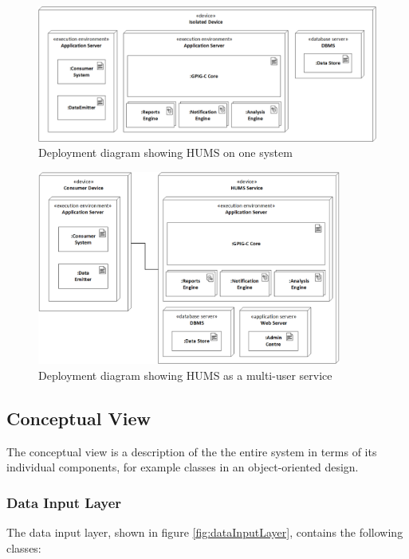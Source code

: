 \documentclass[10pt,a4paper]{article}
\begin{document}
\begin{figure}[!ht]
  \centering
  \includegraphics[width=12.5cm]{images/DeploymentIsolated.png}
  \caption{Deployment diagram showing HUMS on one system}
  \label{fig:DeploymentIsolated}
\end{figure}

\begin{figure}[!ht]
  \centering
  \includegraphics[width=10cm]{images/DeploymentService.png}
  \caption{Deployment diagram showing HUMS as a multi-user service}
  \label{fig:DeploymentService}
\end{figure}

\subsection{Conceptual View}
The conceptual view is a description of the the entire system in terms of its individual components, for example classes in an object-oriented design.

\subsubsection{Data Input Layer}

The data input layer, shown in figure \ref{fig:dataInputLayer},
contains the following classes:
\end{document}
